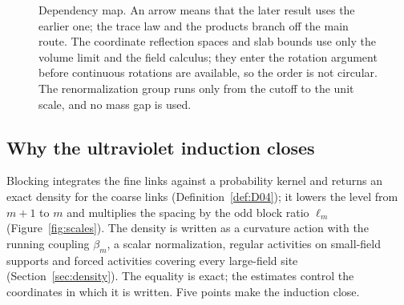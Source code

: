 \begin{figure}[ht]
\caption{Dependency map. An arrow means that the later result uses the earlier one; the trace law and the products branch off the main route. The coordinate reflection spaces and slab bounds use only the volume limit and the field calculus; they enter the rotation argument before continuous rotations are available, so the order is not circular. The renormalization group runs only from the cutoff to the unit scale, and no mass gap is used.}\label{fig:dependency}
\end{figure}

\subsection{Why the ultraviolet induction closes}\label{sec:closes}

Blocking integrates the fine links against a probability kernel and returns an exact density for the coarse links (Definition~\ref{def:D04}); it lowers the level from $m+1$ to $m$ and multiplies the spacing by the odd block ratio $\ell_m$ (Figure~\ref{fig:scales}). The density is written as a curvature action with the running coupling $\beta_m$, a scalar normalization, regular activities on small-field supports and forced activities covering every large-field site (Section~\ref{sec:density}). The equality is exact; the estimates control the coordinates in which it is written. Five points make the induction close.

